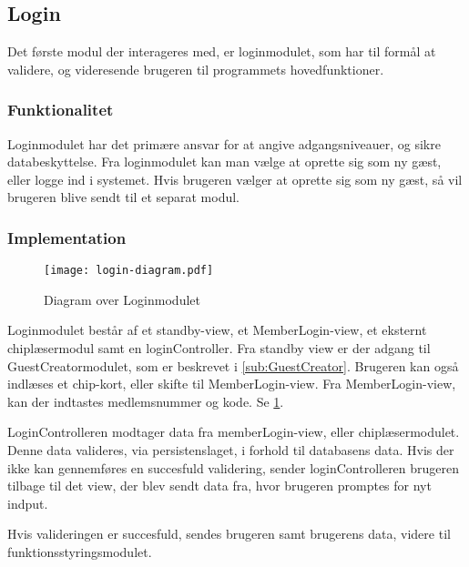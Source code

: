 \subsection{Login}
\label{sub:login}

Det første modul der interageres med, er loginmodulet, som har til formål at validere, og videresende brugeren til programmets hovedfunktioner.

\subsubsection{Funktionalitet}
\label{ssub:login_funktionalitet}

Loginmodulet har det primære ansvar for at angive adgangsniveauer, og sikre databeskyttelse. Fra loginmodulet kan man vælge at oprette sig som ny gæst, eller logge ind i systemet. Hvis brugeren vælger at oprette sig som ny gæst, så vil brugeren blive sendt til et separat modul.

\subsubsection{Implementation}
\label{ssub:login_implementation}

\begin{figure}
  \centering
  \texttt{[image: login-diagram.pdf]}
  \caption{Diagram over Loginmodulet} \label{fig:login}
\end{figure}

Loginmodulet består af et standby-view, et MemberLogin-view, et eksternt chiplæsermodul samt en loginController. Fra standby view er der adgang til GuestCreatormodulet, som er beskrevet i \cref{sub:GuestCreator}. Brugeren kan også indlæses et chip-kort, eller skifte til MemberLogin-view. Fra MemberLogin-view, kan der indtastes medlemsnummer og kode. Se \cref{fig:login}.

LoginControlleren modtager data fra memberLogin-view, eller chiplæsermodulet. Denne data valideres, via persistenslaget, i forhold til databasens data. Hvis der ikke kan gennemføres en succesfuld validering, sender loginControlleren brugeren tilbage til det view, der blev sendt data fra, hvor brugeren promptes for nyt indput.

Hvis valideringen er succesfuld, sendes brugeren samt brugerens data, videre til funktionsstyringsmodulet.
